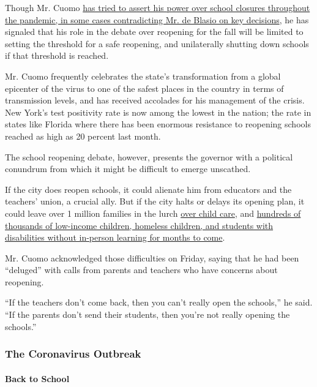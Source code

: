Though Mr. Cuomo
\href{https://www.nytimes3xbfgragh.onion/2020/04/12/nyregion/schools-cuomo-de-blasio-nyc-coronavirus.html}{has
tried to assert his power over school closures throughout the pandemic,
in some cases contradicting Mr. de Blasio on key decisions}, he has
signaled that his role in the debate over reopening for the fall will be
limited to setting the threshold for a safe reopening, and unilaterally
shutting down schools if that threshold is reached.

Mr. Cuomo frequently celebrates the state's transformation from a global
epicenter of the virus to one of the safest places in the country in
terms of transmission levels, and has received accolades for his
management of the crisis. New York's test positivity rate is now among
the lowest in the nation; the rate in states like Florida where there
has been enormous resistance to reopening schools reached as high as 20
percent last month.

The school reopening debate, however, presents the governor with a
political conundrum from which it might be difficult to emerge
unscathed.

If the city does reopen schools, it could alienate him from educators
and the teachers' union, a crucial ally. But if the city halts or delays
its opening plan, it could leave over 1 million families in the lurch
\href{https://www.nytimes3xbfgragh.onion/2020/07/10/nyregion/nyc-school-daycare-reopening.html}{over
child care}, and
\href{https://www.nytimes3xbfgragh.onion/2020/04/16/nyregion/special-education-coronavirus-nyc.html}{hundreds
of thousands of low-income children, homeless children, and students
with disabilities without in-person learning for months to come}.

Mr. Cuomo acknowledged those difficulties on Friday, saying that he had
been ``deluged'' with calls from parents and teachers who have concerns
about reopening.

``If the teachers don't come back, then you can't really open the
schools,'' he said. ``If the parents don't send their students, then
you're not really opening the schools.''

\hypertarget{the-coronavirus-outbreak}{%
\subsubsection{The Coronavirus
Outbreak}\label{the-coronavirus-outbreak}}

\hypertarget{back-to-school}{%
\paragraph{Back to School}\label{back-to-school}}


